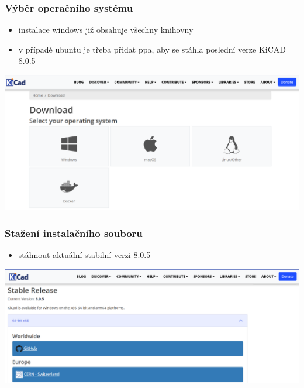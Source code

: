 \documentclass{beamer}
\newcommand{\kicadVersion}{8.0.5}
\begin{document}
	\begin{frame}
    \frametitle{Výběr operačního systému}
		\small
		\begin{itemize}
			\item instalace windows již obsahuje všechny knihovny
			\item v případě ubuntu je třeba přidat ppa, aby se stáhla poslední verze KiCAD \kicadVersion\
		\end{itemize}
		
		\begin{center}
			\includegraphics[scale=0.3]{obr/kicad_dwnld.png}
		\end{center}
	\end{frame}
	\begin{frame}
    \frametitle{Stažení instalačního souboru}
		\small
		\begin{itemize}
			\item stáhnout aktuální stabilní verzi \kicadVersion\
		\end{itemize}
		
		\begin{center}
			\includegraphics[scale=0.3]{obr/kicad_stbv.png}
		\end{center}
	\end{frame}
\end{document}
